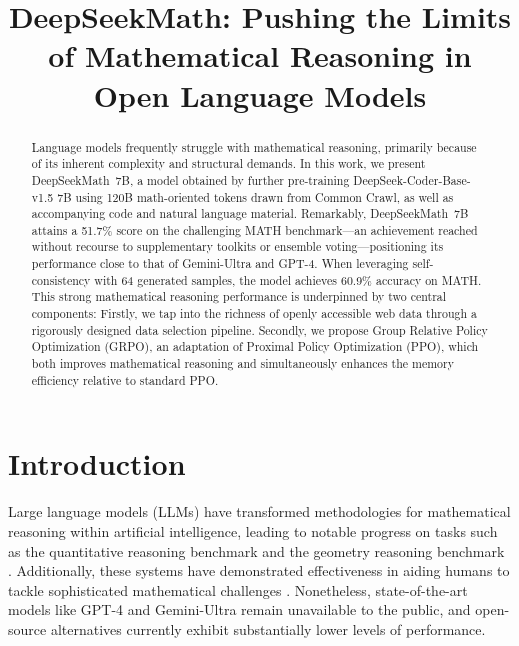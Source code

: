 \title{DeepSeekMath: Pushing the Limits of Mathematical Reasoning in Open Language Models}

\begin{abstract}
Language models frequently struggle with mathematical reasoning, primarily because of its inherent complexity and structural demands. In this work, we present DeepSeekMath~7B, a model obtained by further pre-training DeepSeek-Coder-Base-v1.5 7B using 120B math-oriented tokens drawn from Common Crawl, as well as accompanying code and natural language material. Remarkably, DeepSeekMath~7B attains a 51.7\% score on the challenging MATH benchmark—an achievement reached without recourse to supplementary toolkits or ensemble voting—positioning its performance close to that of Gemini-Ultra and GPT-4. When leveraging self-consistency with 64 generated samples, the model achieves 60.9\% accuracy on MATH. This strong mathematical reasoning performance is underpinned by two central components: Firstly, we tap into the richness of openly accessible web data through a rigorously designed data selection pipeline. Secondly, we propose Group Relative Policy Optimization (GRPO), an adaptation of Proximal Policy Optimization (PPO), which both improves mathematical reasoning and simultaneously enhances the memory efficiency relative to standard PPO.
\end{abstract}

\section{Introduction}

Large language models (LLMs) have transformed methodologies for mathematical reasoning within artificial intelligence, leading to notable progress on tasks such as the quantitative reasoning benchmark \citep{MATH} and the geometry reasoning benchmark \citep{trinh2024solving}. Additionally, these systems have demonstrated effectiveness in aiding humans to tackle sophisticated mathematical challenges \citep{tao}. Nonetheless, state-of-the-art models like GPT-4 \citep{gpt4} and Gemini-Ultra \citep{gemini} remain unavailable to the public, and open-source alternatives currently exhibit substantially lower levels of performance.

